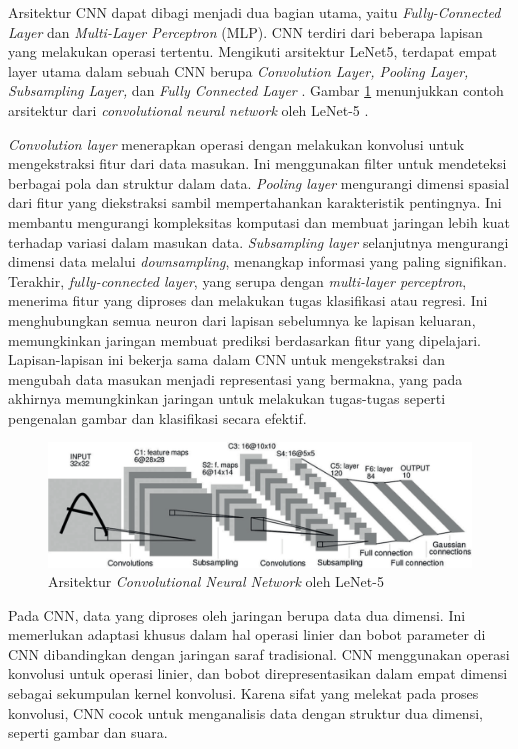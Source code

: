Arsitektur CNN dapat dibagi menjadi dua bagian utama, yaitu \emph{Fully-Connected Layer} dan \emph{Multi-Layer Perceptron} (MLP). CNN terdiri dari beberapa lapisan yang melakukan operasi tertentu. Mengikuti arsitektur LeNet5, terdapat empat layer utama dalam sebuah CNN berupa \emph{Convolution Layer, Pooling Layer, Subsampling Layer,} dan \emph{Fully Connected Layer} \parencite{Putra}. Gambar \ref{fig:arsicnn} menunjukkan contoh arsitektur dari \emph{convolutional neural network} oleh LeNet-5 \parencite{Lecun}.

\emph{Convolution layer} menerapkan operasi dengan melakukan konvolusi untuk mengekstraksi fitur dari data masukan. Ini menggunakan filter untuk mendeteksi berbagai pola dan struktur dalam data. \emph{Pooling layer} mengurangi dimensi spasial dari fitur yang diekstraksi sambil mempertahankan karakteristik pentingnya. Ini membantu mengurangi kompleksitas komputasi dan membuat jaringan lebih kuat terhadap variasi dalam masukan data. \emph{Subsampling layer} selanjutnya mengurangi dimensi data melalui \emph{downsampling}, menangkap informasi yang paling signifikan. Terakhir, \emph{fully-connected layer}, yang serupa dengan \emph{multi-layer perceptron}, menerima fitur yang diproses dan melakukan tugas klasifikasi atau regresi. Ini menghubungkan semua neuron dari lapisan sebelumnya ke lapisan keluaran, memungkinkan jaringan membuat prediksi berdasarkan fitur yang dipelajari. Lapisan-lapisan ini bekerja sama dalam CNN untuk mengekstraksi dan mengubah data masukan menjadi representasi yang bermakna, yang pada akhirnya memungkinkan jaringan untuk melakukan tugas-tugas seperti pengenalan gambar dan klasifikasi secara efektif.

\begin{figure}[H]
  \centering
  \includegraphics[scale=0.8]{gambar/arsitekturcnn.png}
  \caption{Arsitektur \emph{Convolutional Neural Network} oleh LeNet-5 \parencite{Lecun}}
  \label{fig:arsicnn}
\end{figure}

Pada CNN, data yang diproses oleh jaringan berupa data dua dimensi. Ini memerlukan adaptasi khusus dalam hal operasi linier dan bobot parameter di CNN dibandingkan dengan jaringan saraf tradisional. CNN menggunakan operasi konvolusi untuk operasi linier, dan bobot direpresentasikan dalam empat dimensi sebagai sekumpulan kernel konvolusi. Karena sifat yang melekat pada proses konvolusi, CNN cocok untuk menganalisis data dengan struktur dua dimensi, seperti gambar dan suara.

